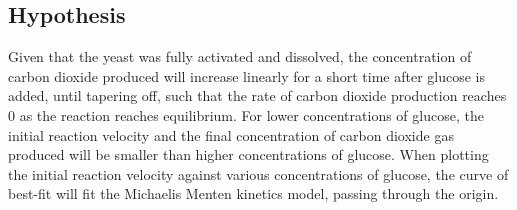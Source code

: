 \documentclass{article}
\begin{document}
\subsection{Hypothesis}
Given that the yeast was fully activated and dissolved, the concentration of carbon dioxide produced will increase linearly for a short time after glucose is added, until tapering off, such that the rate of carbon dioxide production reaches 0 as the reaction reaches equilibrium. For lower concentrations of glucose, the initial reaction velocity and the final concentration of carbon dioxide gas produced will be smaller than higher concentrations of glucose. When plotting the initial reaction velocity against various concentrations of glucose, the curve of best-fit will fit the Michaelis Menten kinetics model, passing through the origin.

\end{document}
